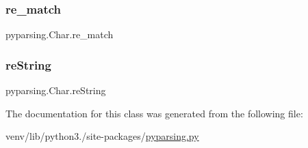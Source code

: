 \mbox{\label{classpyparsing_1_1Char_a5e7ad1eaaa654ee9f059ff1c8da82bff}} 
\subsubsection{\texorpdfstring{re\+\_\+match}{re\_match}}
{\footnotesize\ttfamily pyparsing.\+Char.\+re\+\_\+match}

\mbox{\label{classpyparsing_1_1Char_a4a3093a76e3eb55abd38e31ab1beee7a}} 
\subsubsection{\texorpdfstring{re\+String}{reString}}
{\footnotesize\ttfamily pyparsing.\+Char.\+re\+String}



The documentation for this class was generated from the following file\+:\begin{DoxyCompactItemize}
\item 
venv/lib/python3./site-\/packages/\hyperlink{pyparsing_8py}{pyparsing.\+py}\end{DoxyCompactItemize}
